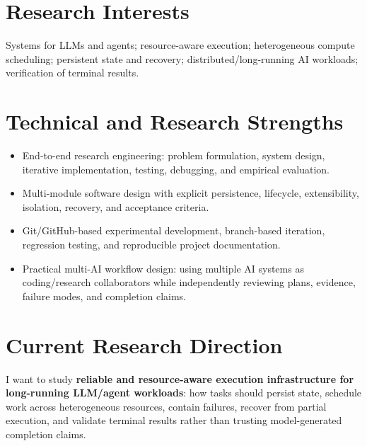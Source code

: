 \documentclass[10pt,a4paper]{article}
\begin{document}
\section{Research Interests}
Systems for LLMs and agents; resource-aware execution; heterogeneous compute scheduling; persistent state and recovery; distributed/long-running AI workloads; verification of terminal results.

\section{Technical and Research Strengths}
\begin{itemize}
  \item End-to-end research engineering: problem formulation, system design, iterative implementation, testing, debugging, and empirical evaluation.
  \item Multi-module software design with explicit persistence, lifecycle, extensibility, isolation, recovery, and acceptance criteria.
  \item Git/GitHub-based experimental development, branch-based iteration, regression testing, and reproducible project documentation.
  \item Practical multi-AI workflow design: using multiple AI systems as coding/research collaborators while independently reviewing plans, evidence, failure modes, and completion claims.
\end{itemize}

\section{Current Research Direction}
I want to study \textbf{reliable and resource-aware execution infrastructure for long-running LLM/agent workloads}: how tasks should persist state, schedule work across heterogeneous resources, contain failures, recover from partial execution, and validate terminal results rather than trusting model-generated completion claims.
\end{document}

